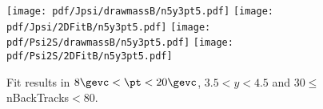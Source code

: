\begin{figure}[H]
\begin{center}
\texttt{[image: pdf/Jpsi/drawmassB/n5y3pt5.pdf]}
\texttt{[image: pdf/Jpsi/2DFitB/n5y3pt5.pdf]}
\vspace*{-0.5cm}
\texttt{[image: pdf/Psi2S/drawmassB/n5y3pt5.pdf]}
\texttt{[image: pdf/Psi2S/2DFitB/n5y3pt5.pdf]}
\vspace*{-0.5cm}
\end{center}
\caption{Fit results in $8\gevc<\pt<20\gevc$, $3.5<y<4.5$ and 30$\leq$nBackTracks$<$80.}
\label{Fitn5y3pt5}
\end{figure}
